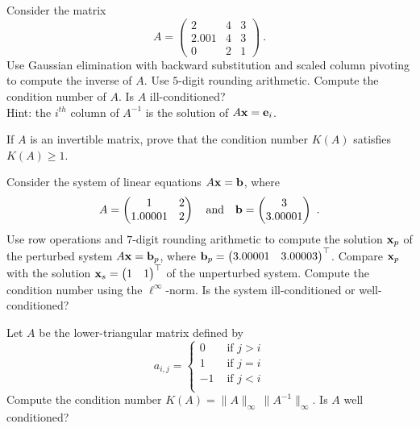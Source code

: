 \begin{question}
Consider the matrix
\[ A =\left(
\begin{array}{ccc}
2 & 4 & 3 \\
2.001 & 4 & 3 \\
0 & 2 & 1
\end{array} \right) \ .
\]
Use Gaussian elimination with backward substitution and scaled column
pivoting to compute the inverse of $A$.  Use $5$-digit rounding
arithmetic.  Compute the condition number of $A$.  Is $A$
ill-conditioned?\\
Hint: the $i^{th}$ column of $A^{-1}$ is the solution of $A\mathbf{x} = \mathbf{e}_i$.
\label{solvCQ3}
\end{question}

\begin{question}
If $A$ is an invertible matrix, prove that the condition number 
$K(A)$ satisfies $K(A)\geq 1$.
\label{solvCQ4}
\end{question}

\begin{question}
Consider the system of linear equations $A\mathbf{x} = \mathbf{b}$, where
\[
A = \begin{pmatrix}
1 & 2 \\
1.00001 & 2
\end{pmatrix} \quad \text{and} \quad
\mathbf{b} = \begin{pmatrix} 3 \\ 3.00001 \end{pmatrix} \ .
\]
Use row operations and $7$-digit rounding arithmetic to compute the
solution $\mathbf{x}_p$ of the perturbed system $A\mathbf{x} = \mathbf{b}_p$,
where $\mathbf{b}_p = \begin{pmatrix} 3.00001 & 3.00003 \end{pmatrix}^\top$.
Compare $\mathbf{x}_p$ with the solution
$\mathbf{x}_s = \begin{pmatrix} 1 & 1 \end{pmatrix}^\top$
of the unperturbed system.  Compute the condition number using the
$\ell^\infty$-norm.  Is the system ill-conditioned or
well-conditioned?
\label{solvCQ5}
\end{question}

\begin{question}
Let $A$ be the \nn lower-triangular matrix defined by
\[
a_{i,j} =
\begin{cases}
0 & \text{ if } j>i \\
1 & \text{ if } j=i \\
-1 & \text{ if } j<i \\
\end{cases}
\]
Compute the condition number
$K(A) = \|A\|_\infty \, \|A^{-1}\|_\infty$.  Is $A$ well conditioned?
\label{solvCQ6}
\end{question}

